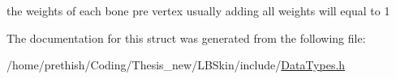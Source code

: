 the weights of each bone pre vertex usually adding all weights will equal to 1 



The documentation for this struct was generated from the following file\-:\begin{DoxyCompactItemize}
\item 
/home/prethish/\-Coding/\-Thesis\-\_\-new/\-L\-B\-Skin/include/\hyperlink{_data_types_8h}{Data\-Types.\-h}\end{DoxyCompactItemize}
